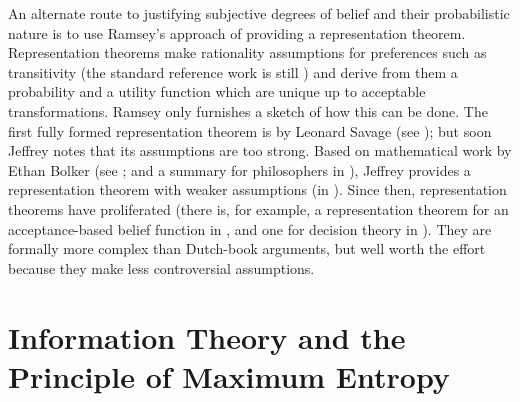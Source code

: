 \documentclass[phd,12pt,oneside]{ubcthesis}
\begin{document}
An alternate route to justifying subjective degrees of belief and
their probabilistic nature is to use Ramsey's approach of providing a
representation theorem. Representation theorems make rationality
assumptions for preferences such as transitivity (the standard
reference work is still ) and derive from them a
probability and a utility function which are unique up to acceptable
transformations. Ramsey only furnishes a sketch of how this can be
done. The first fully formed representation theorem is by Leonard
Savage (see ); but soon Jeffrey notes that its
assumptions are too strong. Based on mathematical work by Ethan Bolker
(see ; and a summary for philosophers in
), Jeffrey provides a representation theorem with
weaker assumptions (in ). Since then,
representation theorems have proliferated (there is, for example, a
representation theorem for an acceptance-based belief function in
, and one for decision theory in
). They are formally more complex than Dutch-book
arguments, but well worth the effort because they make less
controversial assumptions.



\section{Information Theory and the Principle of Maximum Entropy}
\label{sec:ieghosha}
\end{document}
